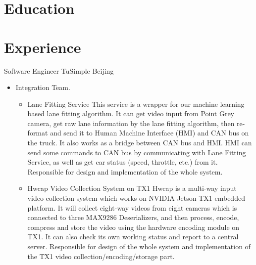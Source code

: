 \documentclass[10pt,a4paper,roman]{moderncv} %
\begin{document}
\makecvtitle

\vspace{-1cm}

\section{Education}

\section{Experience}
        {Software Engineer}
        {}
        {TuSimple Beijing}
        {}
        {\begin{itemize}%
         \item Integration Team.
               \begin{itemize}%
               \item Lane Fitting Service\newline{}%
                     This service is a wrapper for our machine learning based lane fitting algorithm. It can get video input from Point Grey camera, get raw lane information by the lane fitting algorithm, then re-format and send it to Human Machine Interface (HMI) and CAN bus on the truck.\newline{}%
                     It also works as a bridge between CAN bus and HMI. HMI can send some commands to CAN bus by communicating with Lane Fitting Service, as well as get car status (speed, throttle, etc.) from it.\newline{}%
                     Responsible for design and implementation of the whole system.
               \item Hwcap Video Collection System on TX1\newline{}%
                     Hwcap is a multi-way input video collection system which works on NVIDIA Jetson TX1 embedded platform. It will collect eight-way videos from eight cameras which is connected to three MAX9286 Deserializers\footnotemark[1]{}, and then process, encode, compress and store the video using the hardware encoding module on TX1. It can also check its own working status and report to a central server.\newline{}%
                     Responsible for design of the whole system and implementation of the TX1 video collection/encoding/storage part.
               \end{itemize}
         \end{itemize}}
\end{document}

